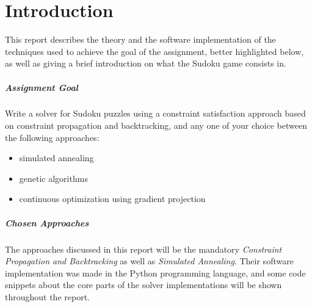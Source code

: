 \chapter{Introduction}

This report describes the theory and the software implementation of the techniques used to achieve the goal of the assignment, better highlighted below, as well as giving a brief introduction on what the Sudoku game consists in.

\paragraph{Assignment Goal} Write a solver for Sudoku puzzles using a constraint satisfaction approach based on constraint propagation and backtracking, and any one of your choice between the following approaches:

\begin{itemize}
    \item simulated annealing
    \item genetic algorithms
    \item continuous optimization using gradient projection
\end{itemize}

\paragraph{Chosen Approaches} The approaches discussed in this report will be the mandatory \textit{Constraint Propagation and Backtracking} as well as \textit{Simulated Annealing}. Their software implementation was made in the Python programming language, and some code snippets about the core parts of the solver implementations will be shown throughout the report.
